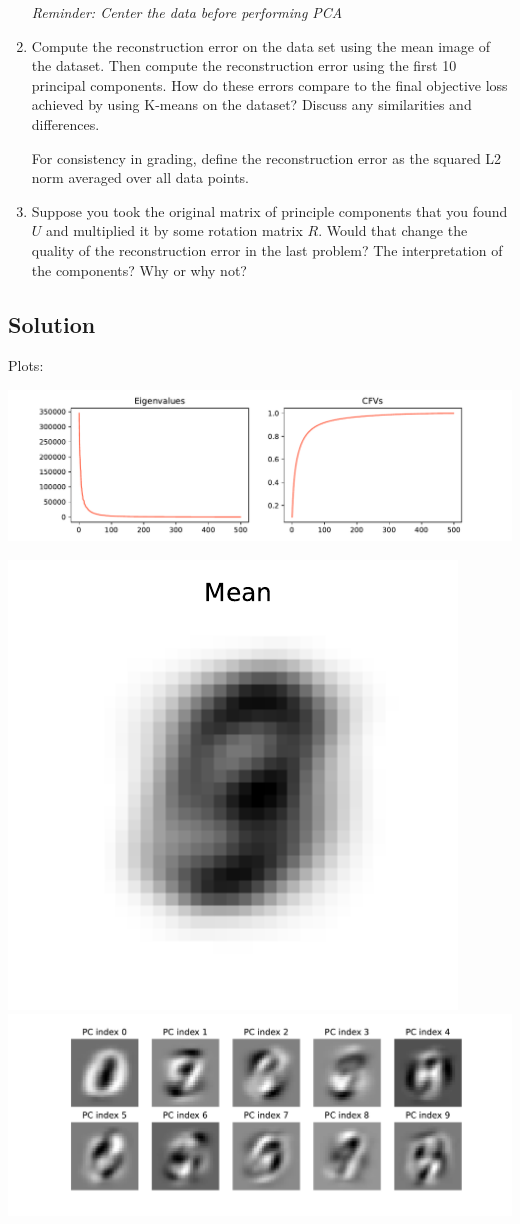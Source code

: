 \documentclass[submit]{harvardml}
\begin{document}
\begin{problem}
\begin{enumerate}
  \textit{Reminder: Center the data before performing PCA}

\item Compute the reconstruction error on the data set using the mean
  image of the dataset.  Then compute the reconstruction error using
  the first 10 principal components.  How do these errors compare to
  the final objective loss achieved by using K-means on the dataset?
  Discuss any similarities and differences.

  For consistency in grading, define the reconstruction error as the squared L2
  norm averaged over all data points.

\item Suppose you took the original matrix of principle components
  that you found $U$ and multiplied it by some rotation matrix $R$.
  Would that change the quality of the reconstruction error in the
  last problem?  The interpretation of the components?  Why or why
  not?
  
\end{enumerate}


\end{problem}

\newpage
\subsection*{Solution}
Plots:

\includegraphics[width=\linewidth]{p2_cfvs}

\includegraphics[width=0.25\linewidth]{p2_mean}
\includegraphics[width=0.75\linewidth]{p2_pcomps}
\end{document}
